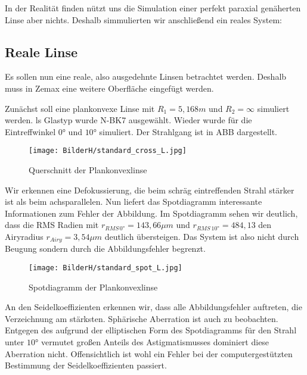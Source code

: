 \documentclass[twoside,colorback,accentcolor=tud4c,11pt]{tudreport}
\begin{document}
		In der Realität finden nützt uns die Simulation einer perfekt paraxial genäherten Linse aber nichts. Deshalb simmulierten wir anschließend ein reales System:
		
		\subsection{Reale Linse}
		
		Es sollen nun eine reale, also ausgedehnte Linsen betrachtet werden. Deshalb muss in Zemax eine weitere Oberfläche eingefügt werden. 
		
		Zunächst soll eine plankonvexe Linse mit $R_1 = 5,168 m$ und $R_2 = \infty$ simuliert werden. ls Glastyp wurde N-BK7 ausgewählt. Wieder wurde für die Eintreffwinkel $0°$ und $10°$ simuliert. Der Strahlgang ist in ABB dargestellt.
		
		
		\begin{figure}[H]
\centering
   	\begin{minipage}[b]{\textwidth}
\centering   	\texttt{[image: BilderH/standard\_cross\_L.jpg]}
   	\caption{Querschnitt der Plankonvexlinse}
  	\end{minipage}
\end{figure}
				
		
		Wir erkennen eine Defokussierung, die beim schräg eintreffenden Strahl stärker ist als beim achsparallelen.
	Nun liefert das Spotdiagramm interessante Informationen zum Fehler der Abbildung. Im Spotdiagramm sehen wir deutlich, dass die RMS Radien mit $r_{RMS \, 0°} = 143,66 \mu m $ und $r_{RMS \, 10°} = 484,13 $ den Airyradius $r_{Airy} = 3,54 \mu m$ deutlich übersteigen. Das System ist also nicht durch Beugung sondern durch die Abbildungsfehler begrenzt.
	
		\begin{figure}[H]
\centering
   	\begin{minipage}[b]{\textwidth}
\centering   	\texttt{[image: BilderH/standard\_spot\_L.jpg]}
   	\caption{Spotdiagramm der Plankonvexlinse}
  	\end{minipage}
\end{figure}
		
	An den Seidelkoeffizienten erkennen wir, dass alle Abbildungsfehler auftreten, die Verzeichnung am stärksten. Sphärische Aberration ist auch zu beobachten. Entgegen des aufgrund der elliptischen Form des Spotdiagramms für den Strahl unter $10°$ vermutet großen Anteils des Astigmatismusses dominiert diese Aberration nicht. Offensichtlich ist wohl ein Fehler bei der computergestützten Bestimmung der Seidelkoeffizienten passiert.
	
\end{document}
